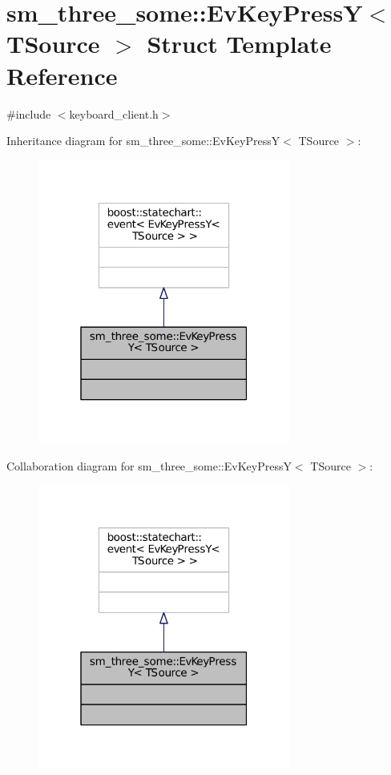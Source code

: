 \hypertarget{structsm__three__some_1_1EvKeyPressY}{}\section{sm\+\_\+three\+\_\+some\+:\+:Ev\+Key\+PressY$<$ T\+Source $>$ Struct Template Reference}
\label{structsm__three__some_1_1EvKeyPressY}


{\ttfamily \#include $<$keyboard\+\_\+client.\+h$>$}



Inheritance diagram for sm\+\_\+three\+\_\+some\+:\+:Ev\+Key\+PressY$<$ T\+Source $>$\+:
\nopagebreak
\begin{figure}[H]
\begin{center}
\leavevmode
\includegraphics[width=235pt]{structsm__three__some_1_1EvKeyPressY__inherit__graph}
\end{center}
\end{figure}


Collaboration diagram for sm\+\_\+three\+\_\+some\+:\+:Ev\+Key\+PressY$<$ T\+Source $>$\+:
\nopagebreak
\begin{figure}[H]
\begin{center}
\leavevmode
\includegraphics[width=235pt]{structsm__three__some_1_1EvKeyPressY__coll__graph}
\end{center}
\end{figure}


